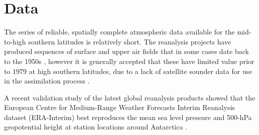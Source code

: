 \section{Data}\label{s:data}

The series of reliable, spatially complete atmospheric data available for the mid-to-high southern latitudes is relatively short. The reanalysis projects have produced sequences of surface and upper air fields that in some cases date back to the 1950s \citep{Kistler2001,Uppala2005,Kobayashi2015}, however it is generally accepted that these have limited value prior to 1979 at high southern latitudes, due to a lack of satellite sounder data for use in the assimilation process \citep{Hines2000}.

A recent validation study of the latest global reanalysis products showed that the European Centre for Medium-Range Weather Forecasts Interim Reanalysis dataset (ERA-Interim) best reproduces the mean sea level pressure and 500-hPa geopotential height at station locations around Antarctica \citep{Bracegirdle2012}.